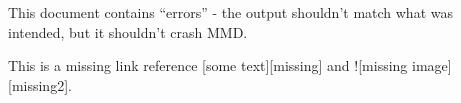 
\def\mytitle{MultiMarkdown Error Test}


This document contains ``errors'' - the output shouldn't match what was
intended, but it shouldn't crash MMD.

This is a missing link reference [some text][missing] and ![missing image][missing2].




